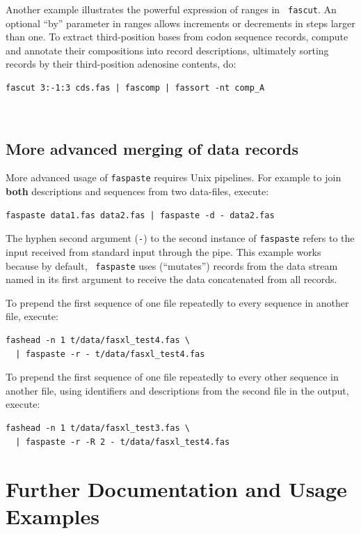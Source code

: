 \documentclass{frontiersSCNS} %
\begin{document}
Another example illustrates the powerful expression of ranges in {\tt
  fascut}. An optional ``by'' parameter in ranges allows increments or
decrements in steps larger than one. To extract third-position bases
from codon sequence records, compute and annotate their compositions
into record descriptions, ultimately sorting records by
their third-position adenosine contents, do:

\begin{verbatim}
fascut 3:-1:3 cds.fas | fascomp | fassort -nt comp_A
\end{verbatim}
\\
\subsection{More advanced merging of data records}

More advanced usage of {\tt faspaste} requires Unix pipelines. For
example to join {\bf both} descriptions and sequences from two
data-files, execute:

\begin{verbatim}
faspaste data1.fas data2.fas | faspaste -d - data2.fas
\end{verbatim}

\noindent The hyphen second argument (\verb|-|) to the second instance
of {\tt faspaste} refers to the input received from standard input
through the pipe. This example works because by default, {\tt
  faspaste} uses (``mutates'') records from the data stream named in
its first argument to receive the data concatenated from all records.

\noindent To prepend the first sequence of one file repeatedly to
every sequence in another file, execute:

\begin{verbatim}
fashead -n 1 t/data/fasxl_test4.fas \ 
  | faspaste -r - t/data/fasxl_test4.fas
\end{verbatim}

\noindent To prepend the first sequence of one file repeatedly to
every other sequence in another file, using identifiers and
descriptions from the second file in the output, execute:

\begin{verbatim}
fashead -n 1 t/data/fasxl_test3.fas \ 
  | faspaste -r -R 2 - t/data/fasxl_test4.fas
\end{verbatim}

\section{Further Documentation and Usage Examples}
\end{document}
